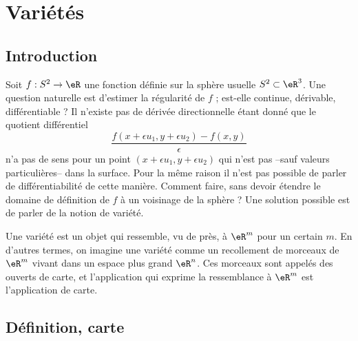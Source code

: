 
\section{Variétés}

\subsection{Introduction}
Soit $f : S^2 \to \eR$ une fonction définie sur la sphère usuelle
$S^2 \subset \eR^3$. Une question naturelle est d'estimer la
régularité de $f$ ; est-elle continue, dérivable, différentiable ? Il
n'existe pas de dérivée directionnelle étant donné que le quotient
différentiel
\begin{equation*}
  \frac{f(x + \epsilon u_1 ,y + \epsilon u_2) - f(x,y)}{\epsilon}
\end{equation*}
n'a pas de sens pour un point $(x + \epsilon u_1 ,y + \epsilon u_2)$
qui n'est pas --sauf valeurs particulières-- dans la surface. Pour la
même raison il n'est pas possible de parler de différentiabilité de
cette manière. Comment faire, sans devoir étendre le domaine de
définition de $f$ à un voisinage de la sphère ? Une solution possible
est de parler de la notion de variété.

Une variété est un objet qui ressemble, vu de près, à $\eR^m$ pour un
certain $m$. En d'autres termes, on imagine une variété comme un
recollement de morceaux de $\eR^m$ vivant dans un espace plus grand
$\eR^n$. Ces morceaux sont appelés des ouverts de carte, et
l'application qui exprime la ressemblance à $\eR^m$ est l'application
de carte.

\subsection{Définition, carte}

